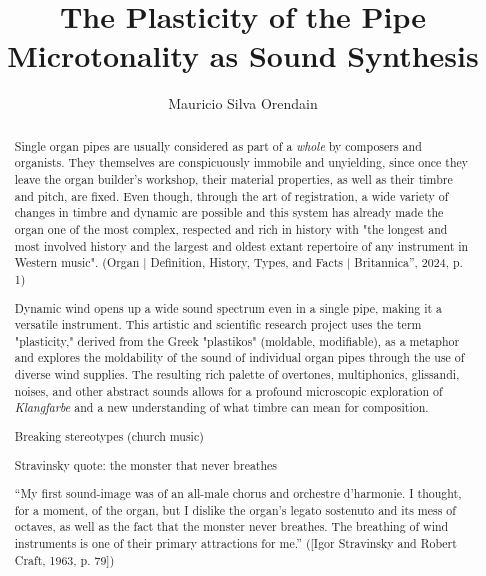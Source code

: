 \documentclass[11pt, oneside]{report}
\title{The Plasticity of the Pipe \\
  \large Microtonality as Sound Synthesis \\
    }
\author{Mauricio Silva Orendain}
\begin{document}
\maketitle

\begin{abstract}
Single organ pipes are usually considered as part of a \textit{whole} by composers and organists. They themselves are conspicuously immobile and unyielding, since once they leave the organ builder's workshop, their material properties, as well as their timbre and pitch, are fixed. Even though, through the art of registration, a wide variety of changes in timbre and dynamic are possible and this system has already made the organ one of the most complex, respected and rich in history with "the longest and most involved history and the largest and oldest extant repertoire of any instrument in Western music". (Organ | Definition, History, Types, and Facts | Britannica”, 2024, p. 1)

Dynamic wind opens up a wide sound spectrum even in a single pipe, making it a versatile instrument. This artistic and scientific research project uses the term "plasticity," derived from the Greek "plastikos" (moldable, modifiable), as a metaphor and explores the moldability of the sound of individual organ pipes through the use of diverse wind supplies. The resulting rich palette of overtones, multiphonics, glissandi, noises, and other abstract sounds allows for a profound microscopic exploration of \textit{Klangfarbe} and a new understanding of what timbre can mean for composition.


Breaking stereotypes (church music) 

Stravinsky quote: the monster that never breathes 

“My first sound-image was of an all-male chorus and orchestre d'harmonie. I thought, for a moment, of the organ, but I dislike the organ's legato sostenuto and its mess of octaves, as well as the fact that the monster never breathes. The breathing of wind instruments is one of their primary attractions for me.” ([Igor Stravinsky and Robert Craft, 1963, p. 79])





\end{abstract}
\end{document}
